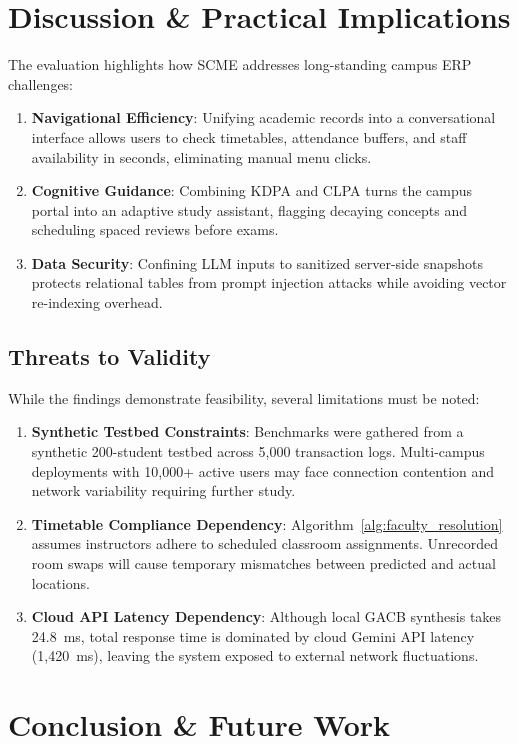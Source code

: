 \documentclass[conference]{IEEEtran}
\begin{document}
\section{Discussion \& Practical Implications}
\label{sec:discussion}

The evaluation highlights how SCME addresses long-standing campus ERP challenges:
\begin{enumerate}
    \item \textbf{Navigational Efficiency}: Unifying academic records into a conversational interface allows users to check timetables, attendance buffers, and staff availability in seconds, eliminating manual menu clicks.
    \item \textbf{Cognitive Guidance}: Combining KDPA and CLPA turns the campus portal into an adaptive study assistant, flagging decaying concepts and scheduling spaced reviews before exams.
    \item \textbf{Data Security}: Confining LLM inputs to sanitized server-side snapshots protects relational tables from prompt injection attacks while avoiding vector re-indexing overhead.
\end{enumerate}

\subsection{Threats to Validity}
While the findings demonstrate feasibility, several limitations must be noted:
\begin{enumerate}
    \item \textbf{Synthetic Testbed Constraints}: Benchmarks were gathered from a synthetic 200-student testbed across 5,000 transaction logs. Multi-campus deployments with 10,000+ active users may face connection contention and network variability requiring further study.
    \item \textbf{Timetable Compliance Dependency}: Algorithm~\ref{alg:faculty_resolution} assumes instructors adhere to scheduled classroom assignments. Unrecorded room swaps will cause temporary mismatches between predicted and actual locations.
    \item \textbf{Cloud API Latency Dependency}: Although local GACB synthesis takes 24.8~ms, total response time is dominated by cloud Gemini API latency (1,420~ms), leaving the system exposed to external network fluctuations.
\end{enumerate}

\section{Conclusion \& Future Work}
\label{sec:conclusion}
\end{document}
